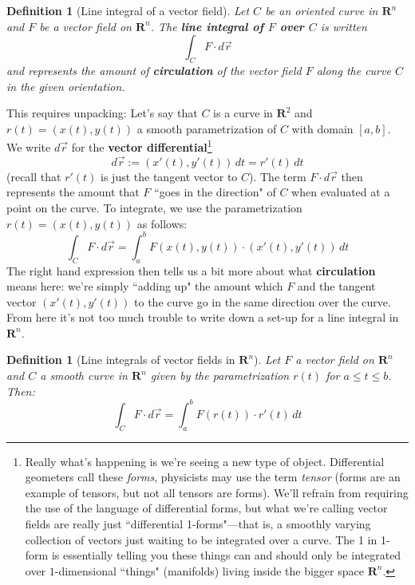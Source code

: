 \documentclass[12pt]{article}
\numberwithin{equation}{subsection}
\numberwithin{figure}{subsection}
\newtheorem{defn}[subsection]{Definition}
\theoremstyle{note}
\begin{document}
{\begin{defn}[Line integral of a vector field] Let $C$ be an oriented curve in $\mathbf{R}^n$ and $F$ be a vector field on $\mathbf{R}^n$. The \textbf{line integral of $F$ over $C$} is written
 \begin{equation} \int_C F\cdot d\vec{r}\end{equation}
 and represents the amount of \textbf{circulation} of the vector field $F$ along the curve $C$ in the given orientation.
 \end{defn} 
This requires unpacking: Let's say that $C$ is a curve in $\mathbf{R}^2$ and $r(t)=(x(t),y(t))$ a smooth parametrization of $C$ with domain $[a,b]$. We write $d\vec{r}$ for the \textbf{vector differential}\footnote{Really what's happening is we're seeing a new type of object. Differential geometers call these \textit{forms}, physicists may use the term \textit{tensor} (forms are an example of tensors, but not all tensors are forms). We'll refrain from requiring the use of the language of differential forms, but what we're calling vector fields are really just ``differential 1-forms"---that is, a smoothly varying collection of vectors just waiting to be integrated over a curve. The 1 in 1-form is essentially telling you these things can and should only be integrated over $1$-dimensional ``things" (manifolds) living inside the bigger space $\mathbf{R}^n$.} \[d\vec{r}:=(x'(t),y'(t)) \,dt=r'(t)\,dt\] (recall that $r'(t)$ is just the tangent vector to $C$).  The term $F\cdot d\vec{r}$ then represents the amount that $F$ ``goes in the direction" of $C$ when evaluated at a point on the curve. To integrate, we use the  parametrization $r(t)=(x(t),y(t))$ as follows: \begin{equation} \label{vector-line-int-2-alt}
	\int_C F\cdot d\vec{r}= \int_a^b F(x(t),y(t))\cdot (x'(t),y'(t))\,dt
\end{equation}
The right hand expression then tells us a bit more about what \textbf{circulation} means here: we're simply ``adding up" the amount which $F$ and the tangent vector $(x'(t),y'(t))$ to the curve go in the same direction over the curve. From here it's not too much trouble to write down a set-up for a line integral in $\mathbf{R}^n$. 

\begin{defn}[Line integrals of vector fields in $\mathbf{R}^n$] Let $F$ a vector field on $\mathbf{R}^n$ and $C$ a smooth curve in $\mathbf{R}^n$ given by the parametrization $r(t)$ for $a\leq t\leq b$. Then:
\begin{equation} \label{vector-line-int-3-alt}
	\int_C F\cdot d\vec{r}= \int_a^b F(r(t))\cdot r'(t)\,dt
\end{equation}
\end{defn}

}
\end{document}
